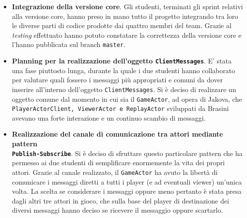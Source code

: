         \begin {itemize}
        \item \textbf{Integrazione della versione core}. Gli studenti, terminati gli sprint relativi alla versione core, hanno preso in mano tutto il progetto integrando tra loro le diverse parti di codice prodotte dai quattro membri del team. Grazie al \textit{testing} effettuato hanno potuto constatare la correttezza della versione core e l'hanno pubblicata sul branch \texttt{master}.
        \item \textbf{Planning per la realizzazione dell'oggetto \texttt{ClientMessages}}. E' stata una fase piuttosto lunga, durante la quale i due studenti hanno collaborato per valutare quali fossero i messaggi più appropriati e comuni da dover inserire all'interno dell'oggetto \texttt{ClientMessages}. Si è deciso di realizzare un oggetto comune dal momento in cui sia il \texttt{GameActor}, ad opera di Jakova, che \texttt{PlayerActorClient, ViewerActor e ReplayActor} sviluppati da Brasini avevano una forte interazione e un continuo scambio di messaggi.
        \item \textbf{Realizzazione del canale di comunicazione tra attori mediante pattern \\ \texttt{Publish-Subscribe}}. Si è deciso di sfruttare questo particolare pattern che ha permesso ai due studenti di semplificare enormemente la vita dei propri attori. Grazie al canale realizzato, il \texttt{GameActor} ha avuto la libertà di comunicare i messaggi diretti a tutti i player (e ad eventuali viewer) un'unica volta. La scelta se considerare i messaggi oppure meno pertanto è stata presa dagli altri tre attori in gioco, che sulla base del player di destinazione dei diversi messaggi hanno deciso se ricevere il messaggio oppure scartarlo.

\end{itemize}
